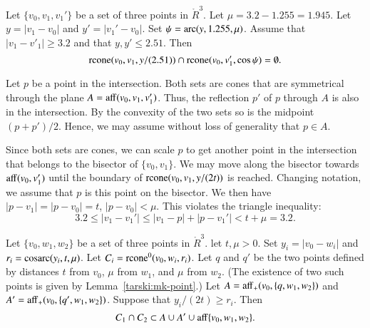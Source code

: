 \begin{tarskidata}
\begin{tarski}
\begin{lemma}
Let $\{v_0,v_1,v_1'\}$ be a set of three points in $\ring{R}^3$.
Let  
$\mu = 3.2 - 1.255 = 1.945$.  Let $y = |v_1-v_0|$ and $y'=|v_1'-v_0|$.
Set $\psi = \operatorname{arc}(y,1.255,\mu)$.
Assume that $|v_1-v'_1|\ge 3.2$ and that $y,y'\le 2.51$.
Then 
   $$
   {\operatorname{rcone}}(v_0,v_1,y/(2.51))\cap {\operatorname{rcone}}(v_0,v_1',\cos\psi)
   =\emptyset .
   $$
\end{lemma}


\begin{proved}
Let $p$ be a point in the intersection.  Both sets are cones
that are symmetrical through the plane $A={\operatorname{aff}}(v_0,v_1,v_1')$.
Thus, the reflection $p'$ of $p$ through $A$ is also
in the intersection.  By the convexity of the two sets so is
the midpoint $(p+p')/2$.  Hence, we may assume without loss of
generality that $p\in A$.

Since both sets are cones,
we can scale $p$ to get another point in the intersection  
that belongs to the bisector of $\{v_0,v_1\}$.  We may
move along the bisector towards ${\operatorname{aff}}(v_0,v_1')$ until
the boundary of ${\operatorname{rcone}}(v_0,v_1,y/(2t))$ is reached.
Changing notation,
we assume that $p$ is this point on the bisector.
We then have $|p-v_1|=|p-v_0|=t$, $|p-v_0|< \mu$.
This violates the triangle inequality:
  $$
  3.2\le |v_1-v_1'| \le |v_1-p| + |p-v_1'| < t + \mu = 3.2. 
  $$
\swallowed\end{proved}
\end{tarski}





\begin{tarski}

\begin{lemma}
Let $\{v_0,w_1,w_2\}$ be a set of three points in $\ring{R}^3$.
let $t,\mu > 0$.  Set $y_i=|v_0-w_i|$
and $r_i={\operatorname{cosarc}}(y_i,t,\mu)$.
Let $C_i={\operatorname{rcone}}^0(v_0,w_i,r_i)$.
Let $q$ and $q'$ be the two points defined by distances
$t$ from $v_0$, $\mu$ from $w_1$, and $\mu$ from $w_2$.
(The existence of two such points is given by Lemma~\ref{tarski:mk-point}.)
Let $A={\operatorname{aff}}_+(v_0,\{q,w_1,w_2\})$ and
$A'={\operatorname{aff}}_+(v_0,\{q',w_1,w_2\})$.
Suppose that $y_i/(2t) \ge r_i$.
Then $$C_1\cap C_2 \subset A\cup A'\cup
      {\operatorname{aff}}\{v_0,w_1,w_2\}.$$
\end{lemma}


\end{tarski}
\end{tarskidata}
